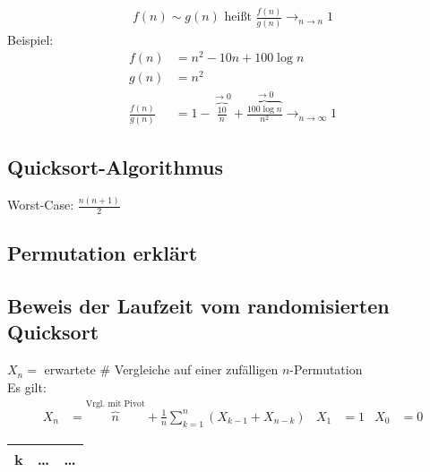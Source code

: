 \begin{align*}
    f(n) \sim g(n) \text{ heißt } \frac{f(n)}{g(n)} \rightarrow_{n \rightarrow n} 1
\end{align*}
Beispiel:
\begin{align*}
    f(n) &= n^2 - 10n + 100 \log n\\
    g(n) &= n^2\\
    \frac{f(n)}{g(n)} &= 1 - \overbrace{\frac{10}{n}}^{\rightarrow 0} + \overbrace{\frac{100 \log n}{n^2}}^{\rightarrow 0} \rightarrow_{n \rightarrow \infty} 1
\end{align*}


\subsection{Quicksort-Algorithmus}
Worst-Case: $\frac{n(n+1)}{2}$

\subsection{Permutation erklärt}
\begin{center}
\end{center}

\subsection{Beweis der Laufzeit vom randomisierten Quicksort}
$X_n =$ erwartete \# Vergleiche auf einer zufälligen $n$-Permutation\\
Es gilt:
\begin{align*}
    X_n &= \overbrace{n}^{\text{Vrgl. mit Pivot}} + \frac{1}{n} \sum_{k =1}^{n} (X_{k-1} + X_{n-k}) & X_1&=1 &X_0 &= 0
\end{align*}

\begin{tabular}{|c|cc|}
     \hline
     k & \dots & \dots\\\hline
\end{tabular}

